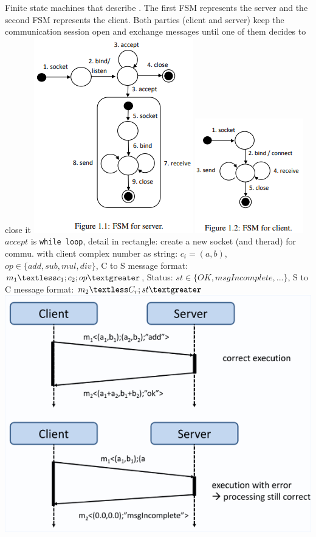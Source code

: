 Finite state machines that describe .
The first FSM represents the server and the second FSM represents the client. Both parties (client and server) keep the communication session open and exchange messages until one of them decides to close it
\includegraphics[width=.45\linewidth]{chap1_2.png} \includegraphics[width=.45\linewidth]{chap1_3.png}
$accept$ is \lstinline{while loop}, detail in rectangle: create a new socket (and therad) for commu. with client
  complex number as string: $c_i = (a, b)$, $op \in \{add, sub, mul, div\}$,
C to S message format: $m_1 \textless c_1;c_2;op \textgreater$,
Status: $st \in \{ OK,msgIncomplete, ... \}$,
S to C message format: $m_2 \textless C_r; st \textgreater$
\includegraphics[width=.45\linewidth]{chap1_4.png} 

